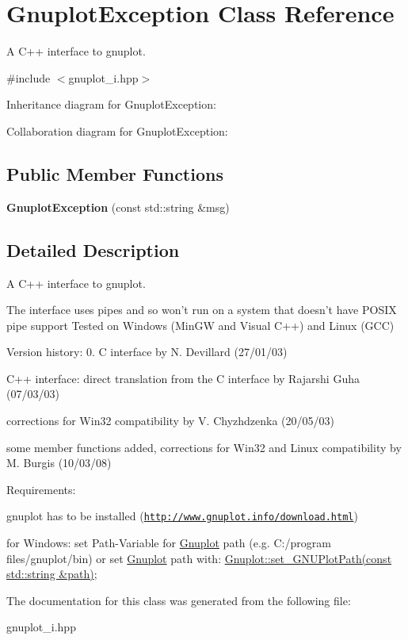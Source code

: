 \hypertarget{classGnuplotException}{\section{Gnuplot\+Exception Class Reference}
\label{classGnuplotException}
}


A C++ interface to gnuplot.  




{\ttfamily \#include $<$gnuplot\+\_\+i.\+hpp$>$}



Inheritance diagram for Gnuplot\+Exception\+:


Collaboration diagram for Gnuplot\+Exception\+:
\subsection*{Public Member Functions}
\begin{DoxyCompactItemize}
\item 
\hypertarget{classGnuplotException_a8b324a9ef4d3f75079d41ecd61c62d44}{{\bfseries Gnuplot\+Exception} (const std\+::string \&msg)}\label{classGnuplotException_a8b324a9ef4d3f75079d41ecd61c62d44}

\end{DoxyCompactItemize}


\subsection{Detailed Description}
A C++ interface to gnuplot. 

The interface uses pipes and so won't run on a system that doesn't have P\+O\+S\+I\+X pipe support Tested on Windows (Min\+G\+W and Visual C++) and Linux (G\+C\+C)

Version history\+: 0. C interface by N. Devillard (27/01/03)
\begin{DoxyEnumerate}
\item C++ interface\+: direct translation from the C interface by Rajarshi Guha (07/03/03)
\item corrections for Win32 compatibility by V. Chyzhdzenka (20/05/03)
\item some member functions added, corrections for Win32 and Linux compatibility by M. Burgis (10/03/08)
\end{DoxyEnumerate}

Requirements\+:
\begin{DoxyItemize}
\item gnuplot has to be installed (\href{http://www.gnuplot.info/download.html}{\tt http\+://www.\+gnuplot.\+info/download.\+html})
\item for Windows\+: set Path-\/\+Variable for \hyperlink{classGnuplot}{Gnuplot} path (e.\+g. C\+:/program files/gnuplot/bin) or set \hyperlink{classGnuplot}{Gnuplot} path with\+: \hyperlink{classGnuplot_a67cae885c26ced821e335d98986f1967}{Gnuplot\+::set\+\_\+\+G\+N\+U\+Plot\+Path(const std\+::string \&path)}; 
\end{DoxyItemize}

The documentation for this class was generated from the following file\+:\begin{DoxyCompactItemize}
\item 
gnuplot\+\_\+i.\+hpp\end{DoxyCompactItemize}
